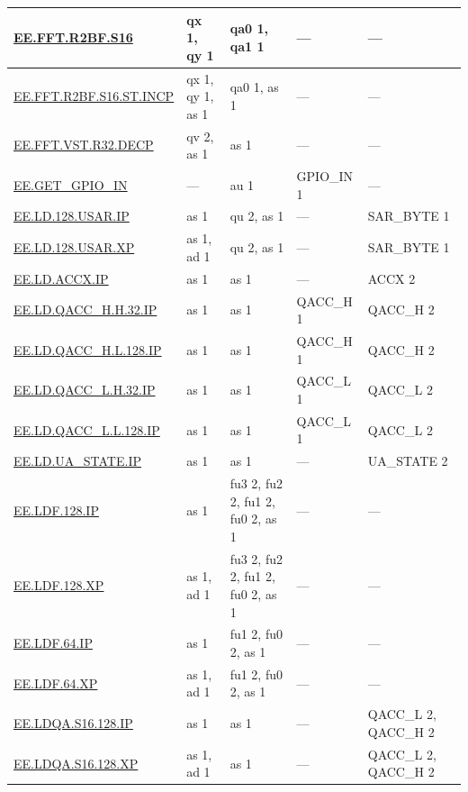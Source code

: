 \begin{longtable}[c]{|l|m{2.5cm}|m{2.5cm}|m{2.5cm}|m{2.5cm}|}
    \hyperref[instruction:EEFFTR2BFS16]{EE.FFT.R2BF.S16} & qx 1, qy 1 & qa0 1, qa1 1 & — & — \\\hline
    \hyperref[instruction:EEFFTR2BFS16STINCP]{EE.FFT.R2BF.S16.ST.INCP} & qx 1, qy 1, as 1 & qa0 1, as 1 & — & — \\\hline
    \hyperref[instruction:EEFFTVSTR32DECP]{EE.FFT.VST.R32.DECP} & qv 2, as 1 & as 1 & — & — \\\hline
    \hyperref[instruction:EEGETGPIOIN]{EE.GET\_GPIO\_IN} & — & au 1 & GPIO\_IN 1 & — \\\hline
    \hyperref[instruction:EELD128USARIP]{EE.LD.128.USAR.IP} & as 1 & qu 2, as 1 & — & SAR\_BYTE 1\\\hline
    \hyperref[instruction:EELD128USARXP]{EE.LD.128.USAR.XP} & as 1, ad 1 & qu 2, as 1 & — & SAR\_BYTE 1\\\hline
    \hyperref[instruction:EELDACCXIP]{EE.LD.ACCX.IP} & as 1 & as 1 & — & ACCX 2\\\hline
    \hyperref[instruction:EELDQACCHH32IP]{EE.LD.QACC\_H.H.32.IP} & as 1 & as 1 & QACC\_H 1 & QACC\_H 2\\\hline
    \hyperref[instruction:EELDQACCHL128IP]{EE.LD.QACC\_H.L.128.IP} & as 1 & as 1 & QACC\_H 1 & QACC\_H 2\\\hline
    \hyperref[instruction:EELDQACCLH32IP]{EE.LD.QACC\_L.H.32.IP} & as 1 & as 1 & QACC\_L 1 & QACC\_L 2\\\hline
    \hyperref[instruction:EELDQACCLL128IP]{EE.LD.QACC\_L.L.128.IP} & as 1 & as 1 & QACC\_L 1 & QACC\_L 2\\\hline
    \hyperref[instruction:EELDUASTATEIP]{EE.LD.UA\_STATE.IP} & as 1 & as 1 & — & UA\_STATE 2\\\hline
    \hyperref[instruction:EELDF128IP]{EE.LDF.128.IP} & as 1 & fu3 2, fu2 2, fu1 2, fu0 2, as 1 & — & — \\\hline
    \hyperref[instruction:EELDF128XP]{EE.LDF.128.XP} & as 1, ad 1 & fu3 2, fu2 2, fu1 2, fu0 2, as 1 & — & — \\\hline
    \hyperref[instruction:EELDF64IP]{EE.LDF.64.IP} & as 1 & fu1 2, fu0 2, as 1 & — & — \\\hline
    \hyperref[instruction:EELDF64XP]{EE.LDF.64.XP} & as 1, ad 1 & fu1 2, fu0 2, as 1 & — & — \\\hline
    \hyperref[instruction:EELDQAS16128IP]{EE.LDQA.S16.128.IP} & as 1 & as 1 & — & QACC\_L 2, QACC\_H 2\\\hline
    \hyperref[instruction:EELDQAS16128XP]{EE.LDQA.S16.128.XP} & as 1, ad 1 & as 1 & — & QACC\_L 2, QACC\_H 2\\\hline

\end{longtable}
